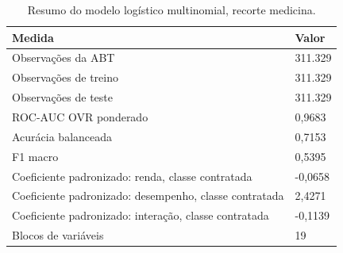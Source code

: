 \begin{table}
\caption{Resumo do modelo logístico multinomial, recorte medicina.}
\label{tab:tabela_logit_ternario_recorte_medicina_principal_in_sample_e5}
\begin{tabular}{ll}
\toprule
Medida & Valor \\
\midrule
Observações da ABT & 311.329 \\
Observações de treino & 311.329 \\
Observações de teste & 311.329 \\
ROC-AUC OVR ponderado & 0,9683 \\
Acurácia balanceada & 0,7153 \\
F1 macro & 0,5395 \\
Coeficiente padronizado: renda, classe contratada & -0,0658 \\
Coeficiente padronizado: desempenho, classe contratada & 2,4271 \\
Coeficiente padronizado: interação, classe contratada & -0,1139 \\
Blocos de variáveis & 19 \\
\bottomrule
\end{tabular}
\end{table}
